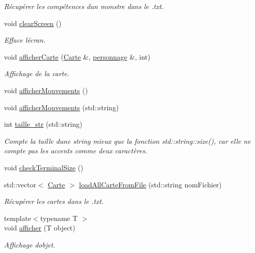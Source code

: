 \begin{DoxyCompactItemize}
\begin{DoxyCompactList}\small\item\em Récupérer les compétences d\textquotesingle{}un monstre dans le .txt. \end{DoxyCompactList}\item 
void \hyperlink{namespaceio_abefd9b2fada48d5e8e260e56e868e952}{clear\+Screen} ()
\begin{DoxyCompactList}\small\item\em Efface l\textquotesingle{}écran. \end{DoxyCompactList}\item 
void \hyperlink{namespaceio_afbd57bbb2dcc5157544fac61120ffcec}{afficher\+Carte} (\hyperlink{class_carte}{Carte} \&, \hyperlink{classpersonnage}{personnage} \&, int)
\begin{DoxyCompactList}\small\item\em Affichage de la carte. \end{DoxyCompactList}\item 
void \hyperlink{namespaceio_ac60b7c3503eb53e69a2adc86368ab633}{afficher\+Mouvements} ()
\item 
void \hyperlink{namespaceio_a04bc641243df7c2655cda6b93dee199e}{afficher\+Mouvements} (std\+::string)
\item 
int \hyperlink{namespaceio_a0161a5c00ad8e7222f3a052e7c9fa67b}{taille\+\_\+str} (std\+::string)
\begin{DoxyCompactList}\small\item\em Compte la taille d\textquotesingle{}une string mieux que la fonction std\+::string\+::size(), car elle ne compte pas les accents comme deux caractères. \end{DoxyCompactList}\item 
void \hyperlink{namespaceio_a5a0d785914a680440e4986a02b50a28e}{check\+Terminal\+Size} ()
\item 
std\+::vector$<$ \hyperlink{class_carte}{Carte} $>$ \hyperlink{namespaceio_abb49308ca24862cc2b64c8c15949af44}{load\+All\+Carte\+From\+File} (std\+::string nom\+Fichier)
\begin{DoxyCompactList}\small\item\em Récupérer les cartes dans le .txt. \end{DoxyCompactList}\item 
{\footnotesize template$<$typename T $>$ }\\void \hyperlink{namespaceio_ac5222293c3d12f7982a8df7ead04ba0b}{afficher} (T object)
\begin{DoxyCompactList}\small\item\em Affichage d\textquotesingle{}objet. \end{DoxyCompactList}\item 

\end{DoxyCompactItemize}
